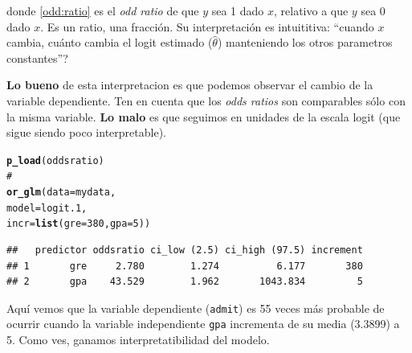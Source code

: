 \documentclass[onesided]{article}\usepackage[]{graphicx}\usepackage[]{color}
\makeatletter
\newcommand{\hlnum}[1]{\textcolor[rgb]{0.686,0.059,0.569}{#1}}%
\newcommand{\hlcom}[1]{\textcolor[rgb]{0.678,0.584,0.686}{\textit{#1}}}%
\newcommand{\hlstd}[1]{\textcolor[rgb]{0.345,0.345,0.345}{#1}}%
\newcommand{\hlkwc}[1]{\textcolor[rgb]{0.333,0.667,0.333}{#1}}%
\newcommand{\hlkwd}[1]{\textcolor[rgb]{0.737,0.353,0.396}{\textbf{#1}}}%
\newenvironment{kframe}{%
 \def\at@end@of@kframe{}%
 \ifinner\ifhmode%
  \def\at@end@of@kframe{\end{minipage}}%
  \begin{minipage}{\columnwidth}%
 \fi\fi%
 \def\FrameCommand##1{\hskip\@totalleftmargin \hskip-\fboxsep
 \colorbox{shadecolor}{##1}\hskip-\fboxsep
     \hskip-\linewidth \hskip-\@totalleftmargin \hskip\columnwidth}%
 \MakeFramed {\advance\hsize-\width
   \@totalleftmargin\z@ \linewidth\hsize
   \@setminipage}}%
 {\par\unskip\endMakeFramed%
 \at@end@of@kframe}
\newenvironment{knitrout}{}{} %
\makeatother
\begin{document}
donde \autoref{odd:ratio} es el \emph{odd ratio} de que $y$ sea 1 dado $x$, relativo a que $y$ sea 0 dado $x$. Es un ratio, una fracci\'on. Su interpretaci\'on es intuititiva: ``cuando $x$ cambia, cu\'anto cambia el logit estimado ($\hat\theta$) manteniendo los otros parametros constantes''?

{\bf Lo bueno} de esta interpretacion es que podemos observar el cambio de la variable dependiente. Ten en cuenta que los \emph{odds ratios} son comparables s\'olo con la misma variable. {\bf Lo malo} es que seguimos en unidades de la escala logit (que sigue siendo poco interpretable).



\begin{knitrout}
\color{fgcolor}\begin{kframe}
\begin{alltt}
\hlkwd{p_load}\hlstd{(oddsratio)}
\hlcom{#}
\hlkwd{or_glm}\hlstd{(}\hlkwc{data} \hlstd{= mydata,}
       \hlkwc{model} \hlstd{= logit.1,}
       \hlkwc{incr} \hlstd{=} \hlkwd{list}\hlstd{(}\hlkwc{gre} \hlstd{=} \hlnum{380}\hlstd{,} \hlkwc{gpa} \hlstd{=} \hlnum{5}\hlstd{))}
\end{alltt}
\begin{verbatim}
##   predictor oddsratio ci_low (2.5) ci_high (97.5) increment
## 1       gre     2.780        1.274          6.177       380
## 2       gpa    43.529        1.962       1043.834         5
\end{verbatim}
\end{kframe}
\end{knitrout}

Aqu\'i vemos que la variable dependiente (\texttt{admit}) es 55 veces m\'as probable de ocurrir cuando la variable independiente \texttt{gpa} incrementa de su media (3.3899) a 5. Como ves, ganamos interpretatibilidad del modelo. 
\end{document}
